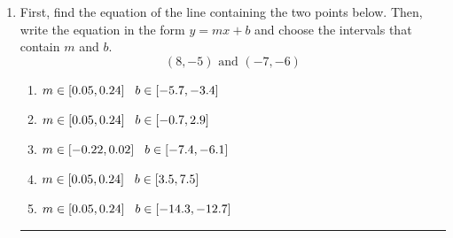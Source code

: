 \documentclass[14pt]{extbook}
\newcommand{\litem}[1]{\item#1\hspace*{-1cm}\rule{\textwidth}{0.4pt}}
\begin{document}
\begin{enumerate}
{\begin{enumerate}[label=\Alph*.]
\end{enumerate} }
\litem{
First, find the equation of the line containing the two points below. Then, write the equation in the form $ y=mx+b $ and choose the intervals that contain $m$ and $b$.\[ (8, -5) \text{ and } (-7, -6) \]\begin{enumerate}[label=\Alph*.]
\item \( m \in [0.05, 0.24] \hspace*{3mm} b \in [-5.7, -3.4] \)
\item \( m \in [0.05, 0.24] \hspace*{3mm} b \in [-0.7, 2.9] \)
\item \( m \in [-0.22, 0.02] \hspace*{3mm} b \in [-7.4, -6.1] \)
\item \( m \in [0.05, 0.24] \hspace*{3mm} b \in [3.5, 7.5] \)
\item \( m \in [0.05, 0.24] \hspace*{3mm} b \in [-14.3, -12.7] \)

\end{enumerate} }
\end{enumerate}
\end{document}
